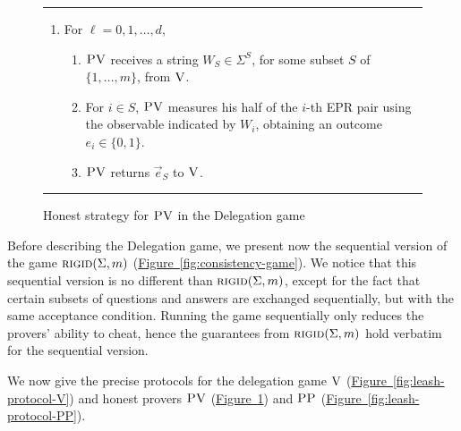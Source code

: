 \documentclass[11pt]{article}
\numberwithin{equation}{section}
\theoremstyle{definition}
\theoremstyle{plain}
\newcommand{\expref}[2]{\hyperref[#2]{#1~\ref{#2}}}
\newcommand{\rigid}{\textsc{rigid}}
\newcommand{\ver}{\textsc{V}}
\newcommand{\pv}{\textsc{PV}}
\newcommand{\pp}{\textsc{PP}}
\begin{document}
  \begin{figure}[htbp]
\rule{\textwidth}{0.5pt}
\vspace{-1.8em}
\begin{enumerate}
\item For $\ell=0,1,\ldots,d$,
\begin{enumerate}
\item $\pv$ receives a string $W_{S} \in\Sigma^{S}$, for some subset $S$ of $\{1,\ldots,m\}$, from $\ver$. 
\item For $i\in S$, $\pv$ measures his half of the $i$-th EPR pair using the observable indicated by $W_i$, obtaining an outcome $e_i\in\{0,1\}$. 
\item $\pv$ returns $\vec{e}_S$ to $\ver$. 
\end{enumerate}
\end{enumerate}
\rule[2ex]{\textwidth}{0.5pt}\vspace{-.5cm}
\caption{Honest strategy for $\pv$ in the Delegation game}\label{fig:leash-protocol-PV}
  \end{figure}
  
	
\noindent  Before describing the Delegation game, we present now the sequential version of the game $\rigid(\Sigma,m)$ (\expref{Figure}{fig:consistency-game}). We notice that this sequential version is no different than $\rigid(\Sigma,m)$, except for the fact that certain subsets of questions and answers are exchanged sequentially, but with the same acceptance condition. Running the game sequentially only reduces the provers' ability to cheat, hence the guarantees from $\rigid(\Sigma,m)$ 
hold verbatim for the sequential version. 


We now give the precise protocols for the delegation game $\ver$ (\expref{Figure}{fig:leash-protocol-V})
and honest provers $\pv$ (\expref{Figure}{fig:leash-protocol-PV}) and $\pp$
(\expref{Figure}{fig:leash-protocol-PP}). 
\end{document}
